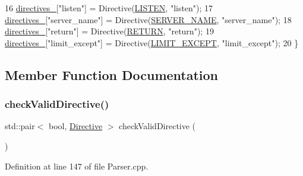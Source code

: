 \begin{DoxyCode}
16         \hyperlink{classft_1_1_parser_abe21d1e60d970dd268181e79250b5399}{directives\_}[\textcolor{stringliteral}{"listen"}] = Directive(\hyperlink{namespaceft_a5a5554dff10f0dc50bae4cc5825ad75da331ec9878c0ed22e62de969d4b96b5bb}{LISTEN}, \textcolor{stringliteral}{"listen"});
17         \hyperlink{classft_1_1_parser_abe21d1e60d970dd268181e79250b5399}{directives\_}[\textcolor{stringliteral}{"server\_name"}] = Directive(\hyperlink{namespaceft_a5a5554dff10f0dc50bae4cc5825ad75da8e7adb687472b53e3ed632cbcb949d88}{SERVER\_NAME}, \textcolor{stringliteral}{"server\_name"});
18         \hyperlink{classft_1_1_parser_abe21d1e60d970dd268181e79250b5399}{directives\_}[\textcolor{stringliteral}{"return"}] = Directive(\hyperlink{namespaceft_a5a5554dff10f0dc50bae4cc5825ad75da520e09ffec033636dba711f3441cc600}{RETURN}, \textcolor{stringliteral}{"return"});
19         \hyperlink{classft_1_1_parser_abe21d1e60d970dd268181e79250b5399}{directives\_}[\textcolor{stringliteral}{"limit\_except"}] = Directive(\hyperlink{namespaceft_a5a5554dff10f0dc50bae4cc5825ad75da25b0e84438d71cc28e97f17a01cfde7a}{LIMIT\_EXCEPT}, \textcolor{stringliteral}{"limit\_except"});
20     \}
\end{DoxyCode}


\subsection{Member Function Documentation}
\mbox{\label{classft_1_1_parser_ad48298d21629daf7c9a31e101bf322ba}} 
\subsubsection{\texorpdfstring{check\+Valid\+Directive()}{checkValidDirective()}}
{\footnotesize\ttfamily std\+::pair$<$ bool, \hyperlink{classft_1_1_directive}{Directive} $>$ check\+Valid\+Directive (\begin{DoxyParamCaption}{ }\end{DoxyParamCaption})}



Definition at line 147 of file Parser.\+cpp.


